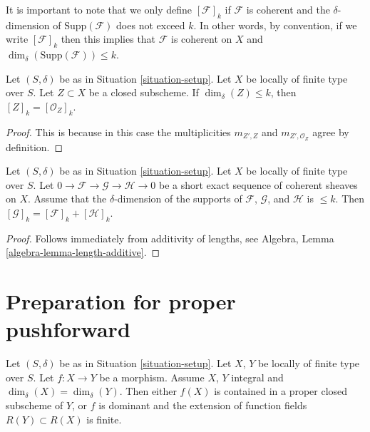 \noindent
It is important to note that we only define $[\mathcal{F}]_k$
if $\mathcal{F}$ is coherent and the $\delta$-dimension
of $\text{Supp}(\mathcal{F})$ does not exceed $k$. In other words,
by convention, if we write $[\mathcal{F}]_k$ then this implies that
$\mathcal{F}$ is coherent on $X$ and
$\dim_\delta(\text{Supp}(\mathcal{F})) \leq k$.

\begin{lemma}
\label{lemma-cycle-closed-coherent}
Let $(S, \delta)$ be as in Situation \ref{situation-setup}.
Let $X$ be locally of finite type over $S$.
Let $Z \subset X$ be a closed subscheme.
If $\dim_\delta(Z) \leq k$, then $[Z]_k = [{\mathcal O}_Z]_k$.
\end{lemma}

\begin{proof}
This is because in this case the multiplicities $m_{Z', Z}$ and
$m_{Z', \mathcal{O}_Z}$ agree by definition.
\end{proof}

\begin{lemma}
\label{lemma-additivity-sheaf-cycle}
Let $(S, \delta)$ be as in Situation \ref{situation-setup}.
Let $X$ be locally of finite type over $S$.
Let $0 \to \mathcal{F} \to \mathcal{G} \to \mathcal{H} \to 0$
be a short exact sequence of coherent sheaves on $X$.
Assume that the $\delta$-dimension of the supports
of $\mathcal{F}$, $\mathcal{G}$, and $\mathcal{H}$ is $\leq k$.
Then $[\mathcal{G}]_k = [\mathcal{F}]_k + [\mathcal{H}]_k$.
\end{lemma}

\begin{proof}
Follows immediately from additivity of lengths, see
Algebra, Lemma \ref{algebra-lemma-length-additive}.
\end{proof}









\section{Preparation for proper pushforward}
\label{section-preparation-pushforward}

\begin{lemma}
\label{lemma-equal-dimension}
Let $(S, \delta)$ be as in Situation \ref{situation-setup}.
Let $X$, $Y$ be locally of finite type over $S$.
Let $f : X \to Y$ be a morphism.
Assume $X$, $Y$ integral and $\dim_\delta(X) = \dim_\delta(Y)$.
Then either $f(X)$ is contained in a proper closed subscheme
of $Y$, or $f$ is dominant and the extension of function fields
$R(Y) \subset R(X)$ is finite.
\end{lemma}

